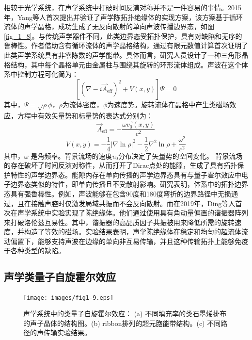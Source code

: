 相较于光学系统，在声学系统中打破时间反演对称并不是一件容易的事情。2015年，Yang等人首次提出并验证了声学陈拓扑绝缘体的实现方案\cite{i1}，该方案基于循环流体的声学晶格，成功生成了无反向散射的单向声波传播边界态，如图\ref{fig_1_8}。与传统声学器件不同，此类边界态受拓扑保护，具有对缺陷和无序的鲁棒性。作者借助含有循环流体的声学晶格结构，通过有限元数值计算首次证明了此类声学系统具有非零陈数的声学能带。具体而言，研究人员设计了一种三角形晶格结构，其中每个晶格单元由金属柱与围绕其旋转的环形流体组成。声波在这个体系中控制方程可化简为：
\[
    \left[ (\nabla - i \vec{A}_{\text{eff}})^2 + V(x, y) \right] \Psi = 0
    \]  
其中，$\Psi = \sqrt{\rho} \phi$，$\rho$为流体密度，$\phi$为速度势。旋转流体在晶格中产生类磁场效应，方程中有效矢量势和标量势的表达式分别为：  
\[
\vec{A}_{\text{eff}} = -\frac{\omega \vec{v_0}(x, y)}{c^2}
\]
\[
V(x, y) = -\frac{1}{4} \left|\nabla \ln \rho\right|^2 - \frac{1}{2} \nabla^2 \ln \rho + \frac{\omega^2}{c^2}
\]  
其中，\(\omega\) 是角频率。背景流场的速度$v_0$分布决定了矢量势的空间变化。
背景流场的存在破坏了时间反演对称性，从而打开了Dirac点处的能隙，生成了具有拓扑保护特性的声学边界态。能隙内存在单向传播的声学边界态具有与量子霍尔效应中电子边界态类似的特性，即单向传播且不受散射影响。研究表明，体系中的拓扑边界态具有强鲁棒性。例如，声波能够在包含90度和180度弯折的边界路径中无损通过，且在接触声腔时仅激发局域共振而不会反向散射。而在2019年，Ding等人首次在声学系统中实验实现了陈绝缘体\cite{i-add-1}。他们通过使用具有角动量偏置的谐振器阵列来打破洛伦兹互易性。其中，谐振器的高品质因子共振被用来降低所需的旋转速度，并构造了等效的磁场。实验结果表明，声学陈绝缘体在稳定和均匀的超流体流动偏置下，能够支持声波在边缘的单向非互易传输，并且这种传输拓扑上能够免疫于各种类型的缺陷。

\subsection{声学类量子自旋霍尔效应}

\begin{figure}[h!]
    \centering
    \texttt{[image: images/fig1-9.eps]} 
    \caption{声学系统中的类量子自旋霍尔效应\cite{i2}：
    (a) 不同填充率的类石墨烯排布的声子晶体的结构图。(b) ribbon排列的超元胞能带结构。(c) 不同路径的声传输实验结果。
    }
    \label{fig_1_9}
\end{figure}

